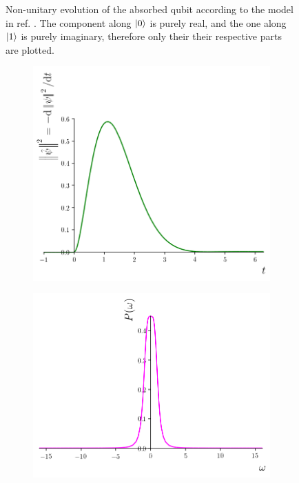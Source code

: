 \begin{figure}
\begin{subfigure}{0.49\textwidth}
    \subcaption{}\label{fig:absorbed-qubit-components:im1}
  \end{subfigure}
  \caption{
    Non-unitary evolution of the absorbed qubit
    according to the model in
    ref. \cite[sec.``Emission from a two-level system'']{RuschhauptAbsorption}.
    The component along $\ket{0}$ is purely real,
    and the one along $\ket{1}$ is purely imaginary,
    therefore only their their respective parts are plotted.
  }\label{fig:absorbed-qubit-components}
\end{figure}

\begin{figure}
  \centering
  \begin{subfigure}[b]{0.49\textwidth}
    \includegraphics[width=\linewidth]{img/2ldetect/qubit_normalization_loss.png}
    \subcaption{}\label{fig:absorbed-qubit-normalization-loss:t}
  \end{subfigure}
  \begin{subfigure}[b]{0.49\textwidth}
    \includegraphics[width=\linewidth]{img/2ldetect/P_omega.png}

\end{subfigure}
\end{figure}
